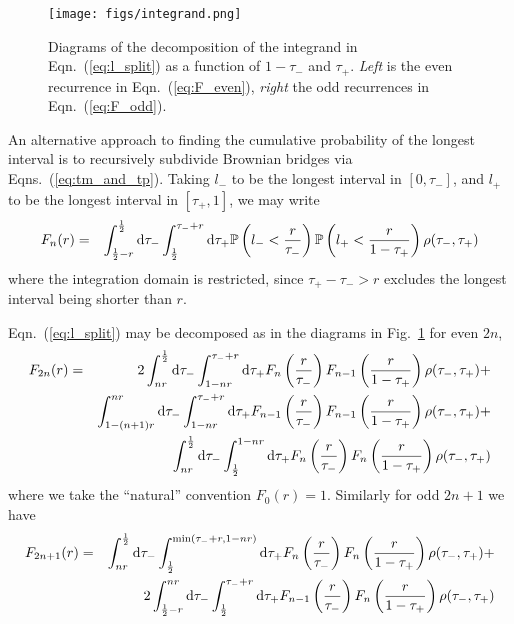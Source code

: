 \documentclass{article}
\newcommand{\tm}{{\tau_{\mathrm{-}}}}
\newcommand{\tp}{{\tau_{\mathrm{+}}}}
\newcommand{\Prob}{\mathbb{P}}
\begin{document}
\begin{figure}
\centering
\texttt{[image: figs/integrand.png]}
\caption{Diagrams of the decomposition of the integrand in Eqn.~(\ref{eq:l_split}) as a function of $1-\tm$ and $\tp$. \emph{Left} is the even recurrence in Eqn.~(\ref{eq:F_even}), \emph{right} the odd recurrences in Eqn.~(\ref{eq:F_odd}).}
\label{fig:integrand}
\end{figure}

An alternative approach to finding the cumulative probability of the longest interval is to recursively subdivide Brownian bridges via Eqns.~(\ref{eq:tm_and_tp}). Taking $l_{\mathrm{-}}$ to be the longest interval in $[0,\tm]$, and $l_{\mathrm{+}}$ to be the longest interval in $[\tp,1]$, we may write
\begin{eqnarray}
  F_{n}(r) &=& \int_{\frac{1}{2}-r}^{\frac{1}{2}} {\rm d}\tm \int_{\frac{1}{2}}^{\tm+r} {\rm d}\tp \Prob\left(l_\mathrm{-} < \frac{r}{\tm}\right)\Prob\left(l_\mathrm{+} <\frac{r}{1-\tp}\right) \rho(\tm,\tp) \label{eq:l_split}
\end{eqnarray}
where the integration domain is restricted, since $\tp-\tm > r$ excludes the longest interval being shorter than $r$.

Eqn.~(\ref{eq:l_split}) may be decomposed as in the diagrams in Fig.~\ref{fig:integrand} for even $2n$,
\begin{eqnarray}
  F_{2n}(r) &=& 2 \int_{nr}^{\frac{1}{2}} {\rm d}\tm \int_{1-nr}^{\tm+r} {\rm d}\tp F_n\left(\frac{r}{\tm}\right)F_{n-1}\left(\frac{r}{1-\tp}\right)\rho(\tm,\tp) + \nonumber \\
  && \int_{1-(n+1)r}^{nr} {\rm d}\tm \int_{1-nr}^{\tm+r} {\rm d}\tp F_{n-1}\left(\frac{r}{\tm}\right)F_{n-1}\left(\frac{r}{1-\tp}\right)\rho(\tm,\tp) + \nonumber \\
  && \int_{nr}^{\frac{1}{2}} {\rm d}\tm \int_{\frac{1}{2}}^{1-nr} {\rm d}\tp F_n\left(\frac{r}{\tm}\right)F_n\left(\frac{r}{1-\tp}\right)\rho(\tm,\tp)  \label{eq:F_even}
\end{eqnarray}
where we take the ``natural'' convention $F_0(r)=1$. Similarly for odd $2n+1$ we have
\begin{eqnarray}
  F_{2n+1}(r) &=& \int_{nr}^{\frac{1}{2}} {\rm d}\tm \int_{\frac{1}{2}}^{\min(\tm+r,1-nr)} {\rm d}\tp F_n\left(\frac{r}{\tm}\right)F_n\left(\frac{r}{1-\tp}\right)\rho(\tm,\tp) + \nonumber  \\
  && 2 \int_{\frac{1}{2}-r}^{nr} {\rm d}\tm \int_{\frac{1}{2}}^{\tm+r} {\rm d}\tp F_{n-1}\left(\frac{r}{\tm}\right)F_n\left(\frac{r}{1-\tp}\right)\rho(\tm,\tp) \label{eq:F_odd}
\end{eqnarray}
\end{document}
